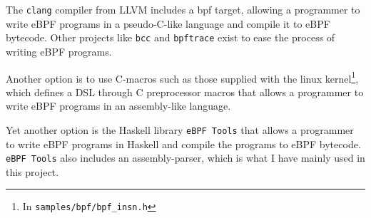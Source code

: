 The \texttt{clang} compiler from LLVM includes a bpf target, allowing a programmer to write eBPF programs in a pseudo-C-like language and compile it to eBPF bytecode.
Other projects like \texttt{bcc}\cite{gh:bcc} and \texttt{bpftrace}\cite{gh:bpftrace} exist to ease the process of writing eBPF programs.

Another option is to use C-macros such as those supplied with the linux kernel\footnote{In \texttt{samples/bpf/bpf\_insn.h}}, which defines a DSL through C preprocessor macros that allows a programmer to write eBPF programs in an assembly-like language.

Yet another option is the Haskell library \texttt{eBPF Tools}\cite{ebpf-tools} that allows a programmer to write eBPF programs in Haskell and compile the programs to eBPF bytecode.  
\texttt{eBPF Tools} also includes an assembly-parser, which is what I have mainly used in this project. 



  







